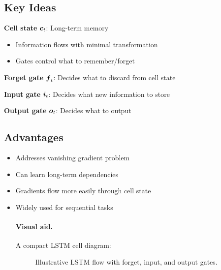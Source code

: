 \subsection{Key Ideas}

\textbf{Cell state} $\boldsymbol{c}_t$: Long-term memory
\begin{itemize}
    \item Information flows with minimal transformation
    \item Gates control what to remember/forget
\end{itemize}

\textbf{Forget gate} $\boldsymbol{f}_t$: Decides what to discard from cell state

\textbf{Input gate} $\boldsymbol{i}_t$: Decides what new information to store

\textbf{Output gate} $\boldsymbol{o}_t$: Decides what to output

\subsection{Advantages}

\begin{itemize}
    \item Addresses vanishing gradient problem
    \item Can learn long-term dependencies
    \item Gradients flow more easily through cell state
    \item Widely used for sequential tasks

\paragraph{Visual aid.} A compact LSTM cell diagram:
\begin{figure}[h]
    \centering
    \caption{Illustrative LSTM flow with forget, input, and output gates.}
\end{figure}
\end{itemize}


